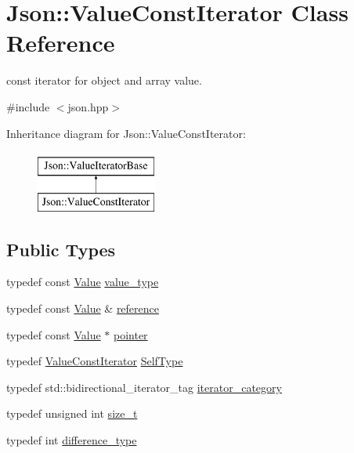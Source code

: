 \hypertarget{classJson_1_1ValueConstIterator}{}\section{Json\+:\+:Value\+Const\+Iterator Class Reference}
\label{classJson_1_1ValueConstIterator}


const iterator for object and array value.  




{\ttfamily \#include $<$json.\+hpp$>$}

Inheritance diagram for Json\+:\+:Value\+Const\+Iterator\+:\begin{figure}[H]
\begin{center}
\leavevmode
\includegraphics[height=2.000000cm]{classJson_1_1ValueConstIterator}
\end{center}
\end{figure}
\subsection*{Public Types}
\begin{DoxyCompactItemize}
\item 
typedef const \hyperlink{classJson_1_1Value}{Value} \hyperlink{classJson_1_1ValueConstIterator_aa5f1707dcef4bfe73e23ddc14dbe760d}{value\+\_\+type}
\item 
typedef const \hyperlink{classJson_1_1Value}{Value} \& \hyperlink{classJson_1_1ValueConstIterator_aa9b05c6a37cd352ea1ee6e13b816f709}{reference}
\item 
typedef const \hyperlink{classJson_1_1Value}{Value} $\ast$ \hyperlink{classJson_1_1ValueConstIterator_a400136bd8bc09e9fddec0785fa2cff14}{pointer}
\item 
typedef \hyperlink{classJson_1_1ValueConstIterator}{Value\+Const\+Iterator} \hyperlink{classJson_1_1ValueConstIterator_a0c2e33e7eb5a80dd8709fb28ece83933}{Self\+Type}
\item 
typedef std\+::bidirectional\+\_\+iterator\+\_\+tag \hyperlink{classJson_1_1ValueIteratorBase_a02fd11a4fbdc0007da1e8bcf5e6b83c3}{iterator\+\_\+category}
\item 
typedef unsigned int \hyperlink{classJson_1_1ValueIteratorBase_a9d3a3c7ce5cdefe23cb486239cf07bb5}{size\+\_\+t}
\item 
typedef int \hyperlink{classJson_1_1ValueIteratorBase_a4e44bf8cbd17ec8d6e2c185904a15ebd}{difference\+\_\+type}
\end{DoxyCompactItemize}
